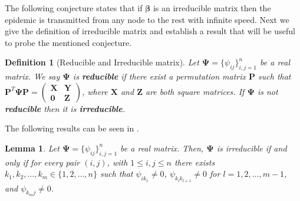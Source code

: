 \documentclass[a4paper,10pt]{article}
\newtheorem{lem}[thm]{Lemma}
\newtheorem{defn}[thm]{Definition}
\newtheorem{prop}[thm]{Proposition}
\theoremstyle{remark}
\newcommand{\bm}[1]{\boldsymbol{#1}}
\begin{document}



The following conjecture states that if $\bm{\beta}$ is an irreducible matrix then the epidemic is transmitted from any node to the rest with infinite speed.
Next we give the definition of irreducible matrix and establish a result that will be useful to probe the mentioned conjecture. 

\begin{defn}[Reducible and Irreducible matrix]
Let $\bm{\Psi}=\{\psi_{ij}\}_{i,j=1}^n$ be a real matrix. We say $\bm{\Psi}$ is \textbf{reducible} if there exist a permutation matrix $\bm{P}$ such that $\bm{P}^{T}\bm{\Psi}\bm{P}=\left(\begin{array}{cc}
     \bm{X}  & \bm{Y}\\
     \bm{0} &  \bm{Z}
\end{array}\right)$, where $\bm{X}$ and $\bm{Z}$ are both square matrices. If $\bm{\Psi}$ is not \textbf{reducible} then it is \textbf{irreducible}.
\end{defn}

The following results can be seen in \cite{CarlD.Meyer538}.

\begin{lem}\label{lema:Psi.irredusible<-->Grafofuert.conectado}
Let $\bm{\Psi}=\{\psi_{ij}\}_{i,j=1}^n$ be a real matrix. Then, $\bm{\Psi}$ is irreducible if and only if for every pair $(i,j)$, with $1\leq i,j\leq n$ there exists $k_1,k_2,\ldots,k_m\in \{1,2,\ldots,n\}$ such that $\psi_{ik_1}\neq 0$, $\psi_{k_lk_{l+1}}\neq 0$ for $l=1,2,\ldots,m-1$, and $\psi_{k_mj}\neq 0$.
\end{lem}
\end{document}
